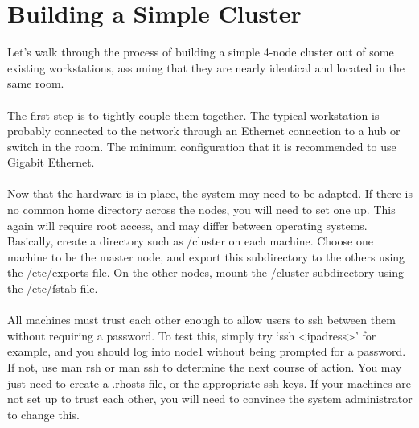 \chapter{Building a Simple Cluster}

 Let's walk through the process of building a simple 4-node cluster out of some existing workstations, assuming that they are nearly identical and located in the same room.
\\~\\
The first step is to tightly couple them together. The typical workstation is probably connected to the network through an Ethernet connection to a hub or switch in the room. The minimum configuration that it is recommended to use Gigabit Ethernet. 
\\~\\
Now that the hardware is in place, the system may need to be adapted. If there is no common home directory across the nodes, you will need to set one up. This again will require root access, and may differ between operating systems. Basically, create a directory such as /cluster on each machine. Choose one machine to be the master node, and export this subdirectory to the others using the /etc/exports file. On the other nodes, mount the /cluster subdirectory using the /etc/fstab file.
\\~\\
All machines must trust each other enough to allow users to ssh between them without requiring a password. To test this, simply try `ssh <ipadress>' for example, and you should log into node1 without being prompted for a password. If not, use man rsh or man ssh to determine the next course of action. You may just need to create a .rhosts file, or the appropriate ssh keys. If your machines are not set up to trust each other, you will need to convince the system administrator to change this. 


